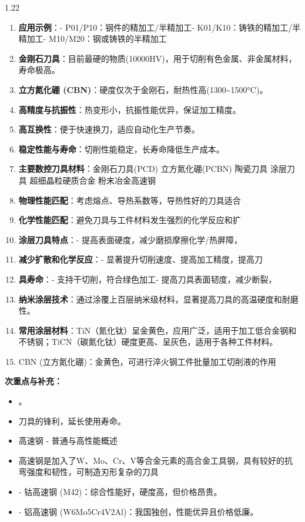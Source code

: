 \documentclass[12pt,a4paper]{article}
\begin{document}
\begin{spacing}{1.22}
\begin{tcolorbox}[colback=yellow!6,colframe=red!55!black,title=重点,left=1mm,right=1mm]
\begin{enumerate}[leftmargin=2.2em,label=\arabic*.]
  \item \textbf{应用示例}：- P01/P10：钢件的精加工/半精加工- K01/K10：铸铁的精加工/半精加工- M10/M20：钢或铸铁的半精加工
  \item \textbf{金刚石刀具}：目前最硬的物质(10000HV)，用于切削有色金属、非金属材料，寿命极高。
  \item \textbf{立方氮化硼 (CBN)}：硬度仅次于金刚石，耐热性高(1300\textasciitilde{}1500°C)。
  \item \textbf{高精度与抗振性}：热变形小，抗振性能优异，保证加工精度。
  \item \textbf{高互换性}：便于快速换刀，适应自动化生产节奏。
  \item \textbf{稳定性能与寿命}：切削性能稳定，长寿命降低生产成本。
  \item \textbf{主要数控刀具材料}：金刚石刀具(PCD) 立方氮化硼(PCBN) 陶瓷刀具 涂层刀具 超细晶粒硬质合金 粉末冶金高速钢
  \item \textbf{物理性能匹配}：考虑熔点、导热系数等，导热性好的刀具适合
  \item \textbf{化学性能匹配}：避免刀具与工件材料发生强烈的化学反应和扩
  \item \textbf{涂层刀具特点}：- 提高表面硬度，减少磨损摩擦化学/热屏障，
  \item \textbf{减少扩散和化学反应}：- 显著提升切削速度、提高加工精度，提高刀
  \item \textbf{具寿命}：- 支持干切削，符合绿色加工- 提高刀具表面韧度，减少断裂，
  \item \textbf{纳米涂层技术}：通过涂覆上百层纳米级材料，显著提高刀具的高温硬度和耐磨性。
  \item \textbf{常用涂层材料}：TiN（氮化钛）呈金黄色，应用广泛，适用于加工低合金钢和不锈钢；TiCN（碳氮化钛）硬度更高、呈灰色，适用于各种工件材料。
  \item CBN (立方氮化硼)：金黄色，可进行淬火钢工件批量加工切削液的作用
\end{enumerate}
\end{tcolorbox}
\noindent\textbf{次重点与补充：}
\begin{itemize}[leftmargin=2.2em,label=--]
  \item 。
  \item 刀具的锋利，延长使用寿命。
  \item 高速钢 - 普通与高性能概述
  \item 高速钢是加入了W、Mo、Cr、V等合金元素的高合金工具钢，具有较好的抗弯强度和韧性，可制造刃形复杂的刀具
  \item - 钴高速钢 (M42)：综合性能好，硬度高，但价格昂贵。
  \item - 铝高速钢 (W6Mo5Cr4V2Al)：我国独创，性能优异且价格低廉。

\end{itemize}
\end{spacing}
\end{document}
